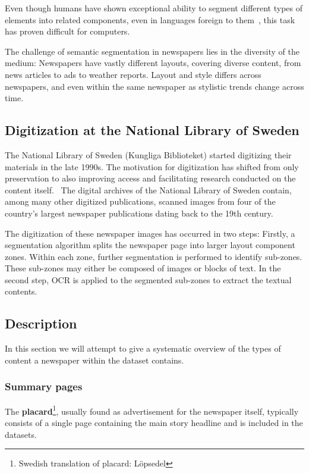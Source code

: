 \documentclass[oneside, english, bibtex]{kththesis}
\begin{document}
Even though humans have shown exceptional ability to segment different types of elements into related components, even in languages foreign to them~\cite{8270006}, this task has proven difficult for computers.

The challenge of semantic segmentation in newspapers lies in the diversity of the medium: Newspapers have vastly different layouts, covering diverse content, from news articles to ads to weather reports. Layout and style differs across newspapers, and even within the same newspaper as stylistic trends change across time.


\subsection{Digitization at the National Library of Sweden}

The National Library of Sweden (Kungliga Biblioteket) started digitizing their materials in the late 1990s. The motivation for digitization has shifted from only preservation to also improving access and facilitating research conducted on the content itself.~\cite{Rekathati_2020} The digital archives of the National Library of Sweden contain, among many other digitized publications, scanned images from four of the country’s largest newspaper publications dating back to the 19th century.

The digitization of these newspaper images has occurred in two steps: Firstly, a segmentation algorithm splits the newspaper page into larger layout component zones. Within each zone, further segmentation is performed to identify sub-zones. These sub-zones may either be composed of images or blocks of text. In the second step, OCR is applied to the segmented sub-zones to extract the textual contents.

\subsection{Description}

In this section we will attempt to give a systematic overview of the types of content a newspaper within the dataset contains.

\subsubsection{Summary pages}

The \textbf{placard}\footnote{Swedish translation of placard: L\"opsedel}, usually found as advertisement for the newspaper itself, typically consists of a single page containing the main story headline and is included in the datasets.
\end{document}
